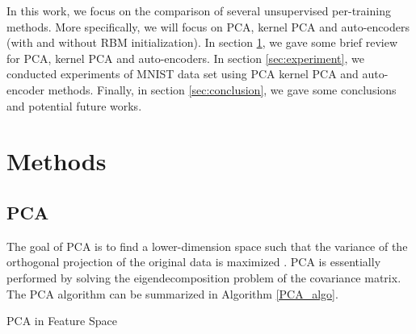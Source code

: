 \documentclass[tikz, multi,dvipsnames,svgnames,x11names]{article}
\makeatletter
\def\BState{\State\hskip-\ALG@thistlm}
\makeatother
\begin{document}
In this work, we focus on the comparison of several unsupervised per-training methods. More specifically, we will focus on PCA, kernel PCA and auto-encoders (with and without RBM initialization). In section \ref{sec:method}, we gave some brief review for PCA, kernel PCA and auto-encoders. In section \ref{sec:experiment}, we conducted experiments of MNIST data set using PCA kernel PCA and auto-encoder methods. Finally, in section \ref{sec:conclusion}, we gave some conclusions and potential future works.

\section{Methods}
\label{sec:method}

\subsection{PCA}
\label{pca}

The goal of PCA is to find a lower-dimension space such that the variance of the orthogonal projection of the original data is maximized \cite{bishop2007pattern}. PCA is essentially performed by solving the eigendecomposition problem of the covariance matrix. The PCA algorithm can be summarized in Algorithm \ref{PCA_algo}.

\begin{algorithm}[htb]
\caption{PCA in Feature Space}
\label{PCA_algo}
\end{algorithm}
\end{document}
